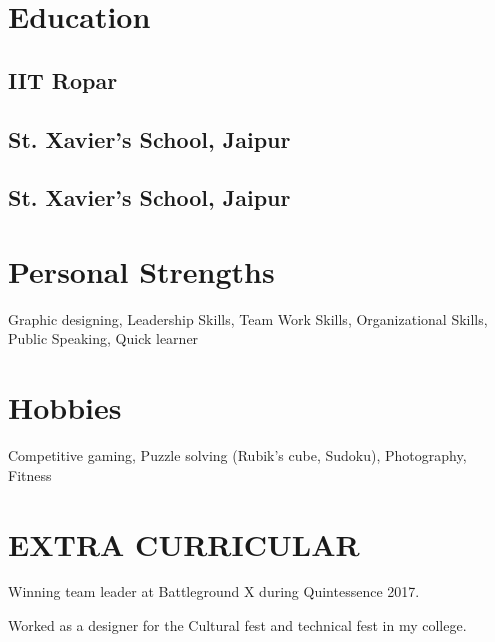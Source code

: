\documentclass[]{deedy-resume-openfont}
\begin{document}
\begin{minipage}[t]{0.33\textwidth}
\section{Education} 

\subsection{IIT Ropar}
\sectionsep
\subsection{St. Xavier's School, Jaipur}
\sectionsep
\subsection{St. Xavier's School, Jaipur}


\section{Personal Strengths}
\vspace{\topsep} %
\begin{tightemize}
\item Graphic designing, Leadership Skills, Team Work Skills, Organizational Skills, Public Speaking, Quick learner 
\end{tightemize}


\section{Hobbies}
\vspace{\topsep} %
\begin{tightemize}
\item Competitive gaming, Puzzle solving (Rubik’s cube, Sudoku), Photography, Fitness 
\end{tightemize}


\section{EXTRA CURRICULAR}
\vspace{\topsep} %
\begin{tightemize}
\item Winning team leader at Battleground X during Quintessence 2017.
\item Worked as a designer for the Cultural fest and technical fest in my college.
\end{tightemize}
\sectionsep


\end{minipage}
\end{document}
